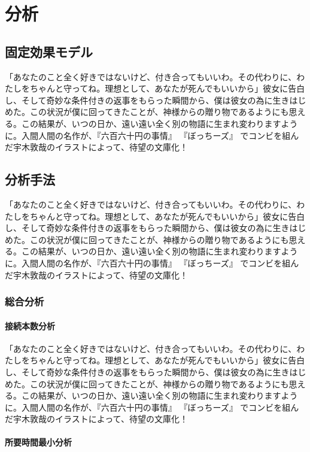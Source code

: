 \chapter{分析}

\section{固定効果モデル}

「あなたのこと全く好きではないけど、付き合ってもいいわ。その代わりに、わたしをちゃんと守ってね。理想として、あなたが死んでもいいから」彼女に告白し、そして奇妙な条件付きの返事をもらった瞬間から、僕は彼女の為に生きはじめた。この状況が僕に回ってきたことが、神様からの贈り物であるようにも思える。この結果が、いつの日か、遠い遠い全く別の物語に生まれ変わりますように。入間人間の名作が、『六百六十円の事情』 『ぼっちーズ』 でコンビを組んだ宇木敦哉のイラストによって、待望の文庫化！

\section{分析手法}

「あなたのこと全く好きではないけど、付き合ってもいいわ。その代わりに、わたしをちゃんと守ってね。理想として、あなたが死んでもいいから」彼女に告白し、そして奇妙な条件付きの返事をもらった瞬間から、僕は彼女の為に生きはじめた。この状況が僕に回ってきたことが、神様からの贈り物であるようにも思える。この結果が、いつの日か、遠い遠い全く別の物語に生まれ変わりますように。入間人間の名作が、『六百六十円の事情』 『ぼっちーズ』 でコンビを組んだ宇木敦哉のイラストによって、待望の文庫化！
\subsection{総合分析}
\subsubsection{接続本数分析}

「あなたのこと全く好きではないけど、付き合ってもいいわ。その代わりに、わたしをちゃんと守ってね。理想として、あなたが死んでもいいから」彼女に告白し、そして奇妙な条件付きの返事をもらった瞬間から、僕は彼女の為に生きはじめた。この状況が僕に回ってきたことが、神様からの贈り物であるようにも思える。この結果が、いつの日か、遠い遠い全く別の物語に生まれ変わりますように。入間人間の名作が、『六百六十円の事情』 『ぼっちーズ』 でコンビを組んだ宇木敦哉のイラストによって、待望の文庫化！

\subsubsection{所要時間最小分析}

